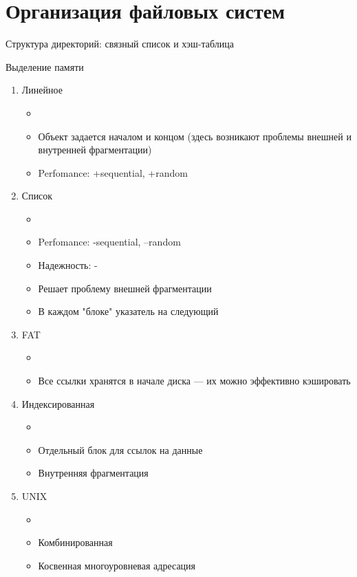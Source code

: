 \documentclass[../lectures.tex]{subfiles}
\begin{document}
\section{Организация файловых систем}
Структура директорий: связный список и хэш-таблица

Выделение памяти
\begin{enumerate}
    \item Линейное
        \begin{itemize}
            \item {}
            \item Объект задается началом и концом (здесь возникают проблемы внешней и внутренней фрагментации)
            \item Perfomance: +sequential, +random
        \end{itemize}
    \item Список
        \begin{itemize}
            \item {}
            \item Perfomance: -sequential, --random
            \item Надежность: -
            \item Решает проблему внешней фрагментации
            \item В каждом "блоке" указатель на следующий
        \end{itemize}
    \item FAT
        \begin{itemize}
            \item {}
            \item Все ссылки хранятся в начале диска --- их можно эффективно кэшировать
        \end{itemize}
    \item Индексированная
        \begin{itemize}
            \item {}
            \item Отдельный блок для ссылок на данные
            \item Внутренняя фрагментация
        \end{itemize}
    \item UNIX
        \begin{itemize}
            \item {}
            \item Комбинированная
            \item Косвенная многоуровневая адресация
        \end{itemize}
\end{enumerate}
\end{document}
